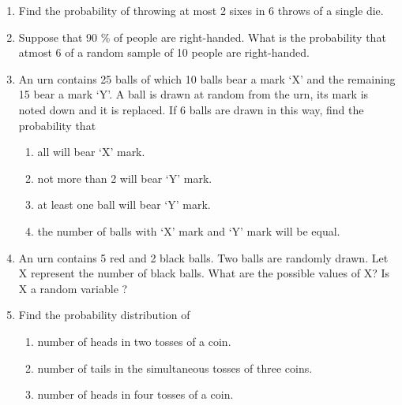 \begin{enumerate}[label=\thesection.\arabic*,ref=\thesection.\theenumi]
\\
\solution

\item Find the probability of throwing at most 2 sixes in 6 throws of a single die.\\
\solution

\item Suppose that 90 \% of people are right-handed. What is the probability that atmost 6 of a random sample of 10 people are right-handed. 
\\
\solution

  \item An urn contains 25 balls of which 10 balls bear a mark `X' and the 
    remaining 15 bear a mark `Y'. A ball is drawn at random from the urn, its 
    mark is noted down and it is replaced. If 6 balls are drawn in this way, 
    find the probability that 
    \begin{enumerate}
        \item all will bear `X' mark. 
        \item not more than 2 will bear `Y' mark. 
        \item at least one ball will bear `Y' mark. 
        \item the number of balls with `X' mark and `Y' mark will be equal.
    \end{enumerate}
\solution


\item An urn contains 5 red and 2 black balls. Two balls are randomly drawn. Let X
represent the number of black balls. What are the possible values of X? Is X a
random variable ? 
\item Find the probability distribution of
\begin{enumerate}
\item number of heads in two tosses of a coin.
\item number of tails in the simultaneous tosses of three coins.
\item number of heads in four tosses of a coin.
\end{enumerate}


\end{enumerate}
